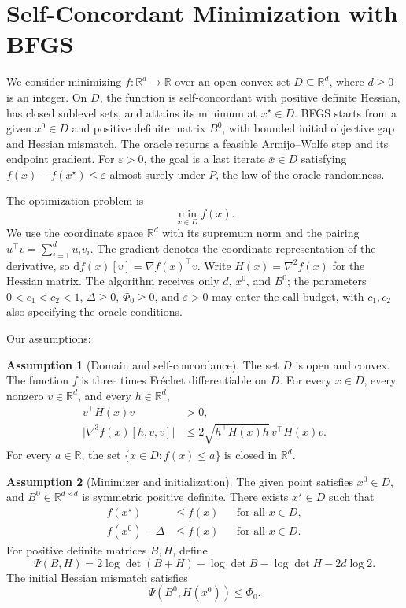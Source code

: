 \documentclass[10pt]{article}
\theoremstyle{definition}
\newtheorem{assumption}{Assumption}
\begin{document}
\section*{Self-Concordant Minimization with BFGS}
We consider minimizing $f:\mathbb{R}^d\to\mathbb{R}$ over an open convex set $D\subseteq\mathbb{R}^d$, where $d\geq0$ is an integer. On $D$, the function is self-concordant with positive definite Hessian, has closed sublevel sets, and attains its minimum at $x^\star\in D$. BFGS starts from a given $x^0\in D$ and positive definite matrix $B^0$, with bounded initial objective gap and Hessian mismatch. The oracle returns a feasible Armijo--Wolfe step and its endpoint gradient. For $\varepsilon>0$, the goal is a last iterate $\bar{x}\in D$ satisfying $f(\bar{x})-f(x^\star)\leq\varepsilon$ almost surely under $P$, the law of the oracle randomness.

The optimization problem is
\[
\min_{x\in D} f(x).
\]
We use the coordinate space $\mathbb{R}^d$ with its supremum norm and the pairing $u^\top v=\sum_{i=1}^d u_i v_i$. The gradient denotes the coordinate representation of the derivative, so $\mathrm{d}f(x)[v]=\nabla f(x)^\top v$. Write $H(x)=\nabla^2 f(x)$ for the Hessian matrix. The algorithm receives only $d$, $x^0$, and $B^0$; the parameters $0<c_1<c_2<1$, $\Delta\geq0$, $\Phi_0\geq0$, and $\varepsilon>0$ may enter the call budget, with $c_1,c_2$ also specifying the oracle conditions.

Our assumptions:
\begin{assumption}[Domain and self-concordance]
The set $D$ is open and convex. The function $f$ is three times Fr\'echet differentiable on $D$. For every $x\in D$, every nonzero $v\in\mathbb{R}^d$, and every $h\in\mathbb{R}^d$,
\[
\begin{aligned}
v^\top H(x)v&>0,\\
\bigl|\nabla^3 f(x)[h,v,v]\bigr|
&\leq 2\sqrt{h^\top H(x)h}\,v^\top H(x)v.
\end{aligned}
\]
For every $a\in\mathbb{R}$, the set $\{x\in D:f(x)\leq a\}$ is closed in $\mathbb{R}^d$.
\end{assumption}

\begin{assumption}[Minimizer and initialization]
The given point satisfies $x^0\in D$, and $B^0\in\mathbb{R}^{d\times d}$ is symmetric positive definite. There exists $x^\star\in D$ such that
\[
\begin{aligned}
f(x^\star)&\leq f(x) &&\text{for all }x\in D,\\
f(x^0)-\Delta&\leq f(x) &&\text{for all }x\in D.
\end{aligned}
\]
For positive definite matrices $B,H$, define
\[
\Psi(B,H)=2\log\det(B+H)-\log\det B
-\log\det H-2d\log 2.
\]
The initial Hessian mismatch satisfies
\[
\Psi(B^0,H(x^0))\leq\Phi_0.
\]
\end{assumption}
\end{document}
